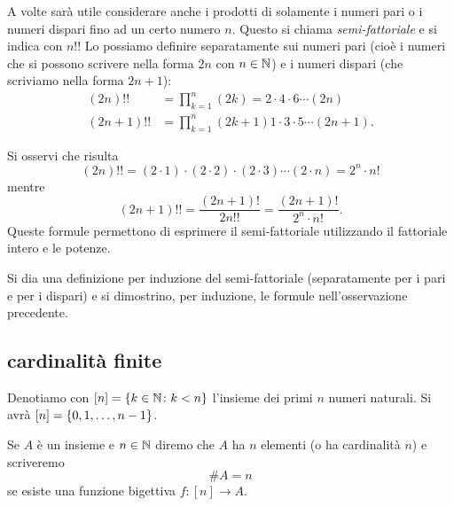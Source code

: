   A volte sarà utile considerare anche i prodotti di solamente i numeri
  pari o i numeri dispari fino ad un certo numero $n$. Questo
  si chiama \emph{semi-fattoriale}%
%
 e si indica con $n!!$
  Lo possiamo definire separatamente sui numeri pari (cioè 
  i numeri che si possono scrivere nella forma $2n$ con $n\in {\mathbb N}$)
  e i numeri dispari (che scriviamo nella forma $2n+1$):
  \begin{align*}
    (2n)!! &= \prod_{k=1}^n (2k) = 2 \cdot 4 \cdot 6 \cdots (2n) \\
    (2n+1)!! &= \prod_{k=1}^n (2k+1)1 \cdot 3 \cdot 5 \cdots (2n+1).
  \end{align*}
  
  \begin{remark}
  \label{rem:doppio_fattoriale}%
  Si osservi che risulta
  \[
    (2n)!! = (2\cdot 1) \cdot (2\cdot 2) \cdot (2\cdot 3) \cdots (2\cdot n)
          = 2^n \cdot n!
  \]
  mentre
  \[
    (2n+1)!! = \frac{(2n+1)!}{2n!!} = \frac{(2n+1)!}{2^n\cdot n!}.
  \]
  Queste formule permettono di esprimere il semi-fattoriale utilizzando
  il fattoriale intero e le potenze.
  \end{remark}
  
\begin{exercise}
  Si dia una definizione per induzione del semi-fattoriale
  (separatamente per i pari e per i dispari)
  e si dimostrino, per induzione, le formule nell'osservazione precedente.
\end{exercise}

\subsection{cardinalità finite}

Denotiamo con $[n] = {\left\{ k\in {\mathbb N}\colon k<n \right\}}$
l'insieme dei primi $n$ numeri naturali.
Si avrà $[n]={\left\{ 0,1,\dots, n-1 \right\}}$.

\begin{definition}
Se $A$ è un insieme e $n\in {\mathbb N}$ diremo che 
$A$ ha $n$ elementi (o ha cardinalità $n$) e scriveremo 
%
\[
  \#A = n
\]
se esiste una funzione bigettiva $f\colon [n]\to A$.
\end{definition}

